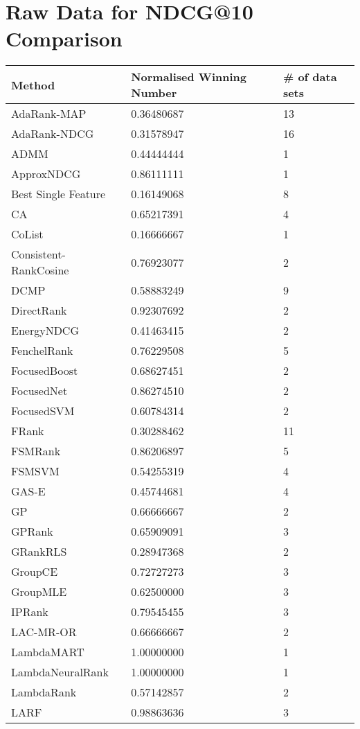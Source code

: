 \chapter{Raw Data for NDCG@10 Comparison}
\label{app:norm_winnum_ndcg10}

\begin{longtable}{l|l|l}
Method & Normalised Winning Number & \# of data sets \\
\hline
AdaRank-\acs{MAP} & 0.36480687 & 13 \\ 
AdaRank-\acs{NDCG} & 0.31578947 & 16 \\ 
\acs{ADMM} & 0.44444444 & 1 \\ 
Approx\acs{NDCG} & 0.86111111 & 1 \\ 
Best Single Feature & 0.16149068 & 8 \\ 
CA & 0.65217391 & 4 \\ 
CoList & 0.16666667 & 1 \\ 
Consistent-RankCosine & 0.76923077 & 2 \\ 
DCMP & 0.58883249 & 9 \\ 
DirectRank & 0.92307692 & 2 \\ 
Energy\acs{NDCG} & 0.41463415 & 2 \\ 
FenchelRank & 0.76229508 & 5 \\ 
FocusedBoost & 0.68627451 & 2 \\ 
FocusedNet & 0.86274510 & 2 \\ 
Focused\acs{SVM} & 0.60784314 & 2 \\ 
FRank & 0.30288462 & 11 \\ 
FSMRank & 0.86206897 & 5 \\ 
FSM\acs{SVM} & 0.54255319 & 4 \\ 
GAS-E & 0.45744681 & 4 \\ 
\acs{GP} & 0.66666667 & 2 \\ 
\acs{GP}Rank & 0.65909091 & 3 \\ 
GRank\acs{RLS} & 0.28947368 & 2 \\ 
GroupCE & 0.72727273 & 3 \\ 
Group\acs{MLE} & 0.62500000 & 3 \\ 
\acs{IP}Rank & 0.79545455 & 3 \\ 
LAC-MR-OR & 0.66666667 & 2 \\ 
LambdaMART & 1.00000000 & 1 \\ 
LambdaNeuralRank & 1.00000000 & 1 \\ 
LambdaRank & 0.57142857 & 2 \\ 
LARF & 0.98863636 & 3 \\ 

\end{longtable}
